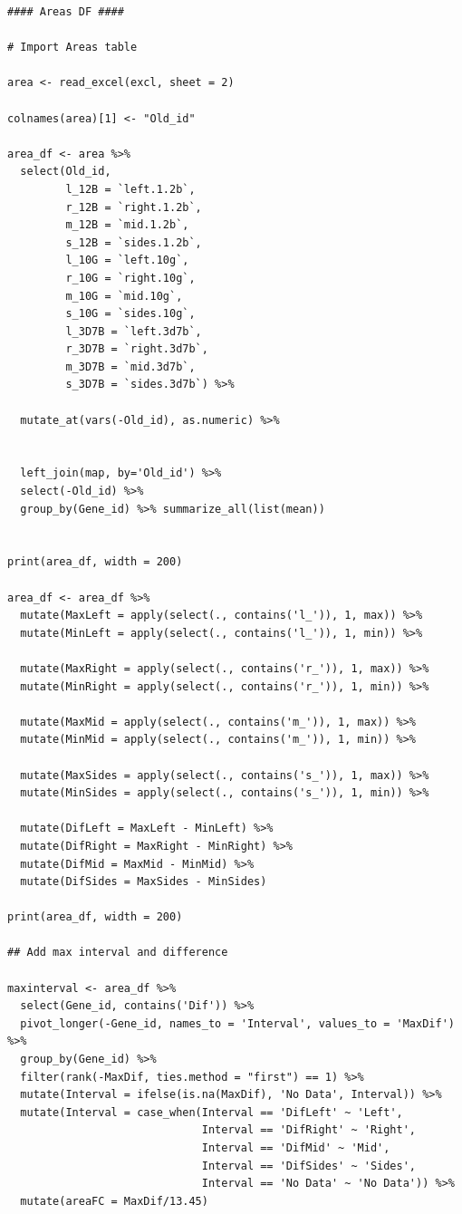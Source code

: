 \documentclass[11pt]{article}
\begin{document}
\begin{verbatim}
#### Areas DF ####

# Import Areas table

area <- read_excel(excl, sheet = 2)

colnames(area)[1] <- "Old_id"

area_df <- area %>%
  select(Old_id,
         l_12B = `left.1.2b`,
         r_12B = `right.1.2b`,
         m_12B = `mid.1.2b`,
         s_12B = `sides.1.2b`,
         l_10G = `left.10g`,
         r_10G = `right.10g`,
         m_10G = `mid.10g`,
         s_10G = `sides.10g`,
         l_3D7B = `left.3d7b`,
         r_3D7B = `right.3d7b`,
         m_3D7B = `mid.3d7b`,
         s_3D7B = `sides.3d7b`) %>%

  mutate_at(vars(-Old_id), as.numeric) %>%


  left_join(map, by='Old_id') %>%
  select(-Old_id) %>%
  group_by(Gene_id) %>% summarize_all(list(mean))


print(area_df, width = 200)

area_df <- area_df %>%
  mutate(MaxLeft = apply(select(., contains('l_')), 1, max)) %>%
  mutate(MinLeft = apply(select(., contains('l_')), 1, min)) %>%

  mutate(MaxRight = apply(select(., contains('r_')), 1, max)) %>%
  mutate(MinRight = apply(select(., contains('r_')), 1, min)) %>%

  mutate(MaxMid = apply(select(., contains('m_')), 1, max)) %>%
  mutate(MinMid = apply(select(., contains('m_')), 1, min)) %>%

  mutate(MaxSides = apply(select(., contains('s_')), 1, max)) %>%
  mutate(MinSides = apply(select(., contains('s_')), 1, min)) %>%

  mutate(DifLeft = MaxLeft - MinLeft) %>%
  mutate(DifRight = MaxRight - MinRight) %>%
  mutate(DifMid = MaxMid - MinMid) %>%
  mutate(DifSides = MaxSides - MinSides)

print(area_df, width = 200)

## Add max interval and difference

maxinterval <- area_df %>%
  select(Gene_id, contains('Dif')) %>%
  pivot_longer(-Gene_id, names_to = 'Interval', values_to = 'MaxDif') %>%
  group_by(Gene_id) %>%
  filter(rank(-MaxDif, ties.method = "first") == 1) %>%
  mutate(Interval = ifelse(is.na(MaxDif), 'No Data', Interval)) %>%
  mutate(Interval = case_when(Interval == 'DifLeft' ~ 'Left',
                              Interval == 'DifRight' ~ 'Right',
                              Interval == 'DifMid' ~ 'Mid',
                              Interval == 'DifSides' ~ 'Sides',
                              Interval == 'No Data' ~ 'No Data')) %>%
  mutate(areaFC = MaxDif/13.45)


\end{verbatim}
\end{document}
